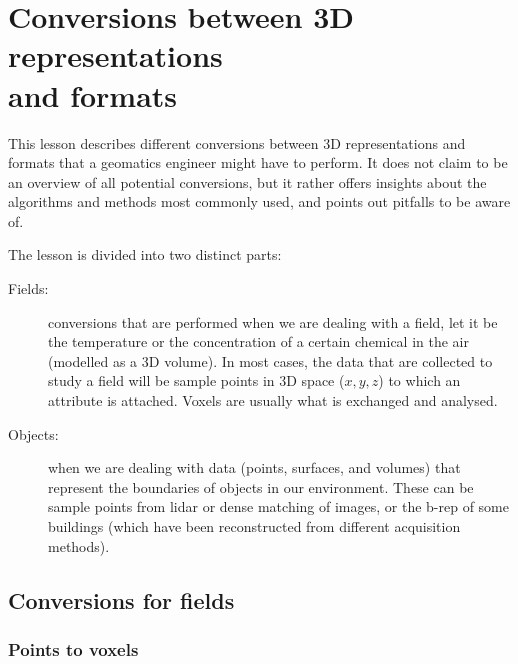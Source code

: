 
\setchapterpreamble[u]{\margintoc}

\graphicspath{{conversion/}}

\chapter{Conversions between 3D representations\\ and formats}%
\label{chap:conversion}

This lesson describes different conversions between 3D representations and formats that a geomatics engineer might have to perform.
It does not claim to be an overview of all potential conversions, but it rather offers insights about the algorithms and methods most commonly used, and points out pitfalls to be aware of.

%

The lesson is divided into two distinct parts:
\begin{description}
  \item[Fields:] conversions that are performed when we are dealing with a field, let it be the temperature or the concentration of a certain chemical in the air (modelled as a 3D volume). 
  In most cases, the data that are collected to study a field will be sample points in 3D space ($x,y,z$) to which an attribute is attached. 
  Voxels are usually what is exchanged and analysed.
  \item[Objects:] when we are dealing with data (points, surfaces, and volumes) that represent the boundaries of objects in our environment. 
  These can be sample points from lidar or dense matching of images, or the b-rep of some buildings (which have been reconstructed from different acquisition methods).
\end{description}



%
\section{Conversions for fields}


\subsection{Points to voxels}

